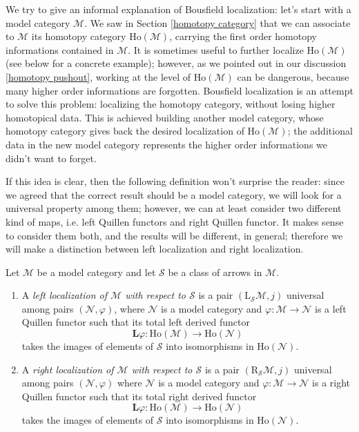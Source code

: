\begin{refsection}
We try to give an informal explanation of Bousfield localization: let's start with a model category $\mathcal M$. We saw in Section \ref{homotopy category} that we can associate to $\mathcal M$ its homotopy category $\mathrm{Ho}(\mathcal M)$, carrying the first order homotopy informations contained in $\mathcal M$. It is sometimes useful to further localize $\mathrm{Ho}(\mathcal M)$ (see below for a concrete example); however, as we pointed out in our discussion \ref{homotopy pushout}, working at the level of $\mathrm{Ho}(\mathcal M)$ can be dangerous, because many higher order informations are forgotten. Bousfield localization is an attempt to solve this problem: localizing the homotopy category, without losing higher homotopical data. This is achieved building another model category, whose homotopy category gives back the desired localization of $\mathrm{Ho}(\mathcal M)$; the additional data in the new model category represents the higher order informations we didn't want to forget.

If this idea is clear, then the following definition won't surprise the reader: since we agreed that the correct result should be a model category, we will look for a universal property among them; however, we can at least consider two different kind of maps, i.e. left Quillen functors and right Quillen functor. It makes sense to consider them both, and the results will be different, in general; therefore we will make a distinction between left localization and right localization.

\begin{defin} \label{def left right localization}
Let $\mathcal M$ be a model category and let $\mathcal S$ be a class of arrows in $\mathcal M$.
\begin{enumerate}
\item A \emph{left localization of $\mathcal M$ with respect to $\mathcal S$} is a pair $(\mathrm L_{\mathcal S} \mathcal M, j)$ universal among pairs $(\mathcal N, \varphi)$, where $\mathcal N$ is a model category and $\varphi \colon \mathcal M \to \mathcal N$ is a left Quillen functor such that its total left derived functor
\[
\mathbf L \varphi \colon \mathrm{Ho}(\mathcal M) \to \mathrm{Ho}(\mathcal N)
\]
takes the images of elements of $\mathcal S$ into isomorphisms in $\mathrm{Ho}(\mathcal N)$.

\item A \emph{right localization of $\mathcal M$ with respect to $\mathcal S$} is a pair $(\mathrm R_{\mathcal S} \mathcal M, j)$ universal among pairs $(\mathcal N, \varphi)$ where $\mathcal N$ is a model category and $\varphi \colon \mathcal M \to \mathcal N$ is a right Quillen functor such that its total right derived functor
\[
\mathbf L \varphi \colon \mathrm{Ho}(\mathcal M) \to \mathrm{Ho}(\mathcal N)
\]
takes the images of elements of $\mathcal S$ into isomorphisms in $\mathrm{Ho}(\mathcal N)$.
\end{enumerate}
\end{defin}


\end{refsection}
